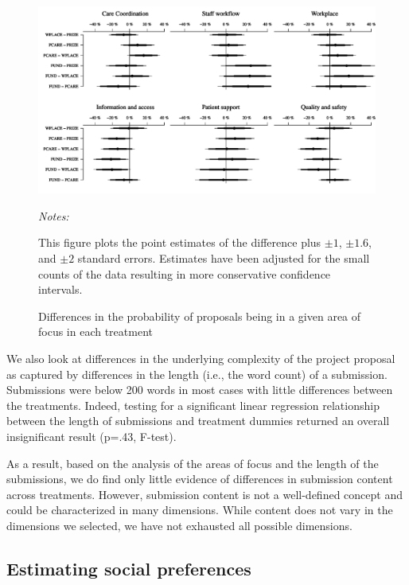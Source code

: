 \documentclass[12pt, titlepage]{article}
\newenvironment{tablenotes}[1][]{
  \begin{minipage}{\textwidth}\emph{Notes:}{\footnotesize #1}
}{\end{minipage}}
\begin{document}
\begin{figure}
  \centering
  \caption{Differences in the probability of proposals being in a given area of focus in each treatment}
  \label{fig: areas of focus}
  \includegraphics{figures/areas-1.pdf}
  \begin{tablenotes}
  This figure plots the point estimates of the difference plus $\pm 1$, $\pm 1.6$, and $\pm 2$ standard errors. Estimates have been adjusted for the small counts of the data \citep{agresti2000simple} resulting in more conservative confidence intervals.
  \end{tablenotes}
\end{figure}

We also look at differences in the underlying complexity of the project
proposal as captured by differences in the length (i.e., the word count)
of a submission. Submissions were below 200 words in most cases with
little differences between the treatments. Indeed, testing for a
significant linear regression relationship between the length of
submissions and treatment dummies returned an overall insignificant
result (p=.43, F-test).

As a result, based on the analysis of the areas of focus and the length
of the submissions, we do find only little evidence of differences in
submission content across treatments. However, submission content is not
a well-defined concept and could be characterized in many dimensions.
While content does not vary in the dimensions we selected, we have not
exhausted all possible dimensions.

\subsection{Estimating social
preferences}\label{estimating-social-preferences}
\end{document}
